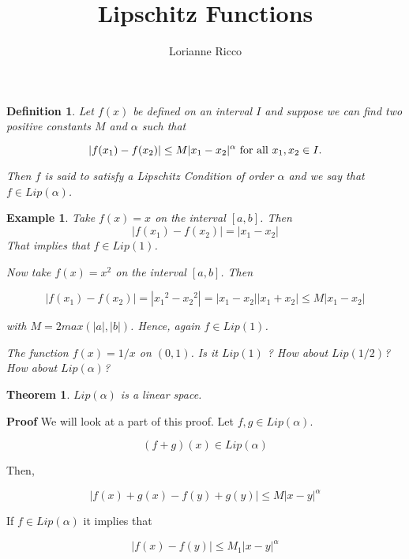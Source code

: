 \documentclass{article}
\title{Lipschitz Functions}
\author{Lorianne Ricco}
\newtheorem{thm}{Theorem}
\newtheorem{dfn}{Definition}
\newtheorem{ex}{Example}
\begin{document}
\maketitle

\begin{dfn}
Let $f(x)$ be defined on an interval $I$ and suppose we can find two positive constants $M$ and $\alpha$  such  that

\begin{displaymath}
| f(x_{1}) - f(x_{2}) | \leq M |x_{1} - x_{2}|^\alpha 
\hbox{ for all } x_{1}, x_{2} \in I.
\end{displaymath}

Then $f$ is said to satisfy a \textit{Lipschitz Condition of order $\alpha$} and
we say that $f \in Lip(\alpha)$. 
\end{dfn}




\begin{ex}
Take $f(x) = x$ on the interval $[a, b]$. Then 
$$
|f(x_1) - f(x_2)| = |x_1 - x_2|
$$
That implies that
$f \in Lip(1)$.

Now take $f(x) = x^2$ on the interval $[a, b]$. Then 

$$
|f(x_1) - f(x_2)| = |{x_1}^2 - {x_2}^2| 
   = |x_1 - x_2| |x_1 + x_2| 
   \le M |x_1 - x_2|
$$

with $M = 2 max(|a|, |b|)$. Hence, again $f \in Lip(1)$.

The function $f(x) = 1/x $ on $(0, 1)$. Is it $Lip(1)$ ? How about $Lip(1/2)$?
How about $Lip(\alpha)$?
\end{ex}




\begin{thm}
$Lip (\alpha)$ is a linear space. 
\end{thm} 

\textbf{Proof}
We will look at a part of this proof.
Let $f,g \in Lip(\alpha)$.  

\begin{displaymath}
(f + g) (x) \in Lip(\alpha)
\end{displaymath}

Then,

\begin{displaymath}
|f(x) + g(x) - f(y) + g(y)| \leq M |x - y|^\alpha
\end{displaymath}

If $f \in Lip (\alpha)$ it implies that 

\begin{displaymath}
|f(x) - f(y)| \leq M_1 |x -y|^\alpha
\end{displaymath}
\end{document}
